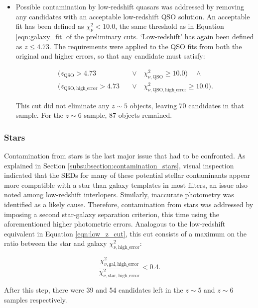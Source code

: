 \begin{itemize}
\item{} Possible contamination by low-redshift quasars was addressed by removing any candidates with an acceptable low-redshift QSO solution. An acceptable fit has been defined as $\chi^2_{\nu}< 10.0$, the same threshold as in Equation \ref{eqn:galaxy_fit} of the preliminary cuts. `Low-redshift' has again been defined as  $z\leq4.73$. The requirements were applied to the QSO fits from both the original and higher errors, so that any candidate must satisfy:   

\begin{equation}
\begin{alignedat}{1}
    (z_{\mathrm{QSO}}>4.73 \quad &\lor \quad \chi^2_{\nu,\mathrm{QSO}}\geq10.0) \quad \land \quad \\ (z_{\mathrm{QSO,high\_error}}>4.73 \quad &\lor \quad \chi^2_{\nu,\mathrm{QSO,high\_error}}\geq10.0).\label{eqn:qso_cut}
\end{alignedat}
\end{equation} 

\noindent This cut did not eliminate any $z\sim5$ objects, leaving 70 candidates in that sample. For the $z\sim6$ sample, 87 objects remained. 
\end{itemize}

\subsubsection{Stars}
Contamination from stars is the last major issue that had to be confronted. As explained in Section \ref{subsubsection:contamination_stars}, visual inspection indicated that the SEDs for many of these potential stellar contaminants appear more compatible with a star than galaxy templates in most filters, an issue also noted among low-redshift interlopers. Similarly, inaccurate photometry was identified as a likely cause. Therefore, contamination from stars was addressed by imposing a second star-galaxy separation criterion, this time using the aforementioned higher photometric errors. Analogous to the low-redshift equivalent in Equation \ref{eqn:low_z_cut}, this cut consists of a maximum on the ratio between the star and galaxy $\chi^2_{\nu,\mathrm{high\_error}}$: 

\begin{equation}
    \frac{\chi^2_{\nu,\mathrm{gal,high\_error}}}{\chi^2_{\nu,\mathrm{star,high\_error}}}< 0.4. \label{eqn:second_star_cut}
\end{equation}

\noindent After this step, there were 39 and 54 candidates left in the $z\sim5$ and $z\sim6$ samples respectively.  \par

